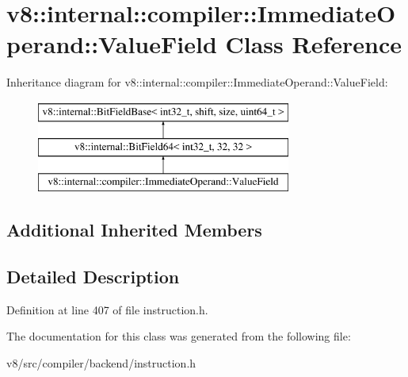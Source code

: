 \hypertarget{classv8_1_1internal_1_1compiler_1_1ImmediateOperand_1_1ValueField}{}\section{v8\+:\+:internal\+:\+:compiler\+:\+:Immediate\+Operand\+:\+:Value\+Field Class Reference}
\label{classv8_1_1internal_1_1compiler_1_1ImmediateOperand_1_1ValueField}
Inheritance diagram for v8\+:\+:internal\+:\+:compiler\+:\+:Immediate\+Operand\+:\+:Value\+Field\+:\begin{figure}[H]
\begin{center}
\leavevmode
\includegraphics[height=3.000000cm]{classv8_1_1internal_1_1compiler_1_1ImmediateOperand_1_1ValueField}
\end{center}
\end{figure}
\subsection*{Additional Inherited Members}


\subsection{Detailed Description}


Definition at line 407 of file instruction.\+h.



The documentation for this class was generated from the following file\+:\begin{DoxyCompactItemize}
\item 
v8/src/compiler/backend/instruction.\+h\end{DoxyCompactItemize}
